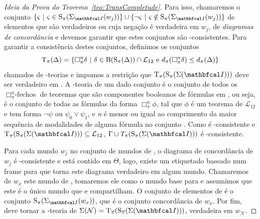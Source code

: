 \begin{proof}[Ideia da Prova do Teorema~\ref{teo:TransCompletude}]
                Para isso, chamaremos o conjunto
                \(\{\varsigma \ | \ \varsigma \in \funcao{S}_{\pi}(\Sigma_{\modeloinicial}(w_j))\} \cup \{\neg \varsigma \ | \ \varsigma \notin \funcao{S}_{\pi}(\Sigma_{\modeloinicial}(w_j))\}\)
                de elementos que são verdadeiros ou cuja negação é verdadeira em \(w_j\), de \textit{diagramas de concordância} e devemos garantir que estes conjuntos são
                -consistentes. Para garantir a consistência destes conjuntos, definimos os conjuntos
                \[
                    \operatorname{T}_{\pi}(\Delta) = \{\Box^{n}_{\pi} \delta \ | \ \delta \in \operatorname{B}(\operatorname{S}_{\pi}(\Delta)) \cap \mathcal{L}_{12} \text{ e } d_\pi(\Box^{n}_{\pi} \delta) \leq d_\pi(\Delta) \}
                \]
                chamados de \PI-teorias e impomos a restrição que \(\funcao{T}_{\pi}(\funcao{S}_{\pi}(\Sigma(\modeloinicial)))\) deve ser verdadeiro em \Mundoinicial. A \PI-teoria
                de um dado conjunto \DDELTA é o conjunto de todos os \(\Box^{n}_{\pi}\text{-fechos}\) de teoremas que são componentes booleanos de fórmulas em \DDELTA, ou seja,
                é o conjunto de todas as fórmulas da forma \(\Box^{n}_{\pi} \phi\), tal que \(\phi\) é um teorema de \(\mathcal{L}_{12}\) e tem forma \(\neg \psi \text{ ou } \psi_0 \lor \psi_1\),
                e \textit{n} é menor ou igual ao comprimento da maior sequência de modalidades \BOXi{\pi} de alguma fórmula no conjunto \DDELTA.
                Como \GAMMA é -consistente e \(\funcao{T}_{\pi}(\funcao{S}_{\pi}(\Sigma(\modeloinicial))) \subseteq \mathcal{L}_{12}\),
                \(\Gamma \cup T_\pi(\funcao{S}_{\pi}(\Sigma(\modeloinicial)))\) é -consistente.

                Para cada mundo \(w_j\) no conjunto de mundos de \Modeloinicial, o diagrama de concordância de \(w_j\) é -consistente e está contido em \(\Theta\),
                logo, existe um \OPImodelo etiquetado  baseado num frame para  que torna este diagrama verdadeiro em algum mundo. Chamaremos de \(w_x\)
                este mundo de , tomaremos ele como o mundo base para  e assumimos que este é o único mundo que \Modeloinicial e  compartilham.
                O conjunto de elementos de  é o conjunto \(\funcao{S}_{\pi}(\Sigma_{\modeloinicial}(w_x))\), que é o conjunto concordância de \(w_x\). Por fim,
                 deve tornar a \OPI-teoria de \(\Sigma(\mathcal{N}) = \funcao{T}_{\overline{\pi}}(\funcao{S}_{\overline{\pi}}(\Sigma(\modeloinicial)))\), verdadeira em \(w_{\mathcal{N}}\).


\end{proof}
